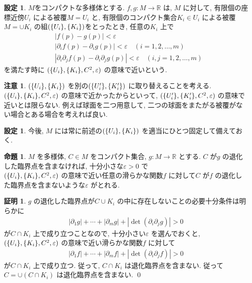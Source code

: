 \documentclass[10pt, fleqn, label-section=none]{bxjsarticle}
\theoremstyle{definition}
\newtheorem{prop}[dfn]{命題}
\newtheorem{setting}[dfn]{設定}
\newtheorem*{pf*}{証明}
\newtheorem{remark}[dfn]{注意}
\newcommand{\veps}{\varepsilon}
\newcommand{\cbra}[1]{\mleft\{#1\mright\}}
\newcommand{\abs}[1]{\left|#1\right|}
\renewcommand{\;}{\, ; \,}
\begin{document}
\begin{setting} $M$をコンパクトな多様体とする. 
$f, g: M \rightarrow \mathbb R$ は, $M$ に対して, 有限個の座標近傍$U_i$ による被覆$M = U_i$ と, 有限個のコンパクト集合$K_i \in U_i$ による被覆$M = \cup K_i$ の組$(\cbra{U_i}, \cbra{K_i})$をとったとき, 任意の$K_i$ 上で
\begin{align*}& \abs{f(p) - g(p)} < \veps \\ & \abs{\partial_i f (p)  - \partial _i g (p) } < \veps \quad (i= 1, 2, \ldots , m) \\ &\abs{\partial_i \partial_j f (p) -\partial_i \partial_j g (p) } < \veps  \quad (i, j = 1, 2, \ldots, m)\end{align*} 
を満たす時に
$(\cbra{U_i}, \cbra{K_i}, C^2, \veps)$ の意味で近いという. 
\end{setting}

\begin{remark}
$(\cbra{U_i}, \cbra{K_i})$ を別の$(\cbra{U^\prime_i}, \cbra{K^\prime_i})$ に取り替えることを考える.  $(\cbra{U_i}, \cbra{K_i}, C^2, \veps)$ の意味で近かったからといって, $(\cbra{U^\prime_i}, \cbra{K^\prime_i}, C^2, \veps)$ の意味で近いとは限らない. 例えば球面を二つ用意して, 二つの球面をまたがる被覆がない場合とある場合を考えれば良い. 
\end{remark}

\begin{setting}
今後, $M$ には常に前述の$(\cbra{U_i}, \cbra{K_i})$ を適当にひとつ固定して備えておく. 
\end{setting}

\begin{prop}$M$ を多様体, $C \in M$ をコンパクト集合, $g: M \rightarrow \mathbb R$ とする. $C$ が$g$ の退化した臨界点を含まなければ, 十分小さな$\veps > 0$ で \\
$(\cbra{U_i}, \cbra{K_i}, C^2, \veps)$ の意味で近い任意の滑らかな関数$f$ に対して$C$ が$f$ の退化した臨界点を含まないような$\veps$ がとれる. 

\end{prop}
\begin{pf*}

$g$ の退化した臨界点が$C\cup K_i$ の中に存在しないことの必要十分条件は明らかに
\begin{align*} \abs{\partial_1 g} + \cdots + \abs{\partial_m g} + \abs{ \det (\partial_i \partial_j g ) } > 0 \end{align*}
が$C\cap K_i$ 上で成り立つことなので, 十分小さい$\veps$ を選んでおくと, $(\cbra{U_i}, \cbra{K_i}, C^2, \veps)$ の意味で近い滑らかな関数$f$ に対して 
\begin{align*} \abs{\partial_1 f} + \cdots + \abs{\partial_m f} + \abs{ \det (\partial_i \partial_j f ) } > 0 \end{align*}
が$C\cap K_i$ 上で成り立つ. 従って, $C \cap K_i $ は退化臨界点を含まない. 従って$C = \cup ( C \cap K_i   )$ は退化臨界点を含まない. 
\qed
\end{pf*}
\end{document}
